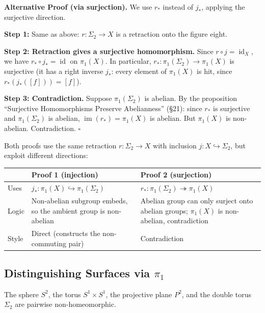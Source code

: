 \documentclass[11pt]{report}
\renewenvironment{proof}[1][Proof]{\noindent\textbf{#1.} }{\hfill$\square$\par\vspace{5pt}}
\begin{document}
\begin{proof}[Alternative Proof (via surjection)]
We use $r_*$ instead of $j_*$, applying the surjective direction.

\textbf{Step 1:} Same as above: $r: \Sigma_2 \to X$ is a retraction onto the figure eight.

\textbf{Step 2: Retraction gives a surjective homomorphism.} Since $r \circ j = \operatorname{id}_X$, we have $r_* \circ j_* = \operatorname{id}$ on $\pi_1(X)$. In particular, $r_*: \pi_1(\Sigma_2) \to \pi_1(X)$ is surjective (it has a right inverse $j_*$: every element of $\pi_1(X)$ is hit, since $r_*(j_*([f])) = [f]$).

\textbf{Step 3: Contradiction.} Suppose $\pi_1(\Sigma_2)$ is abelian. By the proposition ``Surjective Homomorphisms Preserve Abelianness'' (\S 21): since $r_*$ is surjective and $\pi_1(\Sigma_2)$ is abelian, $\operatorname{im}(r_*) = \pi_1(X)$ is abelian. But $\pi_1(X)$ is non-abelian. Contradiction.
\end{proof}

\begin{rembox}
Both proofs use the same retraction $r: \Sigma_2 \to X$ with inclusion $j: X \hookrightarrow \Sigma_2$, but exploit different directions:

\begin{center}
\small
\begin{tabular}{|p{2cm}|p{4.5cm}|p{4.5cm}|}
\hline
& \textbf{Proof 1 (injection)} & \textbf{Proof 2 (surjection)} \\
\hline
Uses & $j_*: \pi_1(X) \hookrightarrow \pi_1(\Sigma_2)$ & $r_*: \pi_1(\Sigma_2) \twoheadrightarrow \pi_1(X)$ \\
\hline
Logic & Non-abelian subgroup embeds, so the ambient group is non-abelian & Abelian group can only surject onto abelian groups; $\pi_1(X)$ is non-abelian, contradiction \\
\hline
Style & Direct (constructs the non-commuting pair) & Contradiction \\
\hline
\end{tabular}
\end{center}
\end{rembox}

\subsection{Distinguishing Surfaces via \texorpdfstring{$\pi_1$}{π₁}}

\begin{corbox}
The sphere $S^2$, the torus $S^1 \times S^1$, the projective plane $P^2$, and the double torus $\Sigma_2$ are pairwise non-homeomorphic.
\end{corbox}
\end{document}
